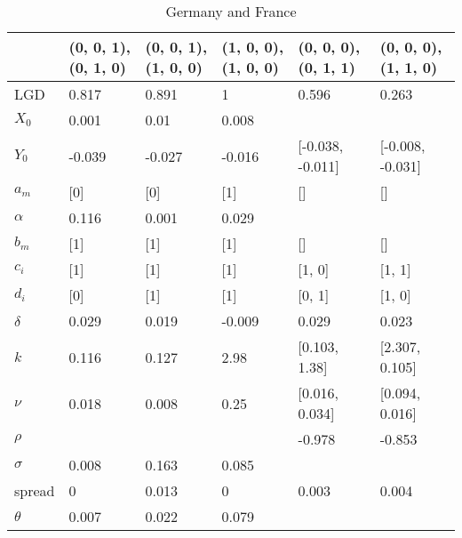 \begin{table}[H]
	\centering
	\caption{Germany and France}
	\label{germany_france}
	
	\begin{adjustbox}{width=\textwidth}
		
\begin{tabular}{llllll}
	\toprule
	{} & (0, 0, 1),(0, 1, 0) & (0, 0, 1),(1, 0, 0) & (1, 0, 0),(1, 0, 0) & (0, 0, 0),(0, 1, 1) & (0, 0, 0),(1, 1, 0) \\
	\midrule
	LGD    &               0.817 &               0.891 &                   1 &               0.596 &               0.263 \\
	$X_0$    &               0.001 &                0.01 &               0.008 &                     &                     \\
	$Y_0$    &              -0.039 &              -0.027 &              -0.016 &    [-0.038, -0.011] &    [-0.008, -0.031] \\
	$a_m$    &                 [0] &                 [0] &                 [1] &                  [] &                  [] \\
	$\alpha$  &               0.116 &               0.001 &               0.029 &                     &                     \\
	$b_m$    &                 [1] &                 [1] &                 [1] &                  [] &                  [] \\
	$c_i$    &                 [1] &                 [1] &                 [1] &              [1, 0] &              [1, 1] \\
	$d_i$    &                 [0] &                 [1] &                 [1] &              [0, 1] &              [1, 0] \\
	$\delta$  &               0.029 &               0.019 &              -0.009 &               0.029 &               0.023 \\
	$k$      &               0.116 &               0.127 &                2.98 &       [0.103, 1.38] &      [2.307, 0.105] \\
	$\nu$     &               0.018 &               0.008 &                0.25 &      [0.016, 0.034] &      [0.094, 0.016] \\
	$\rho$    &                     &                     &                     &              -0.978 &              -0.853 \\
	$\sigma$  &               0.008 &               0.163 &               0.085 &                     &                     \\
	spread &                   0 &               0.013 &                   0 &               0.003 &               0.004 \\
	$\theta$  &               0.007 &               0.022 &               0.079 &                     &                     \\
	\bottomrule
\end{tabular}
		
	\end{adjustbox}
	
\end{table}

